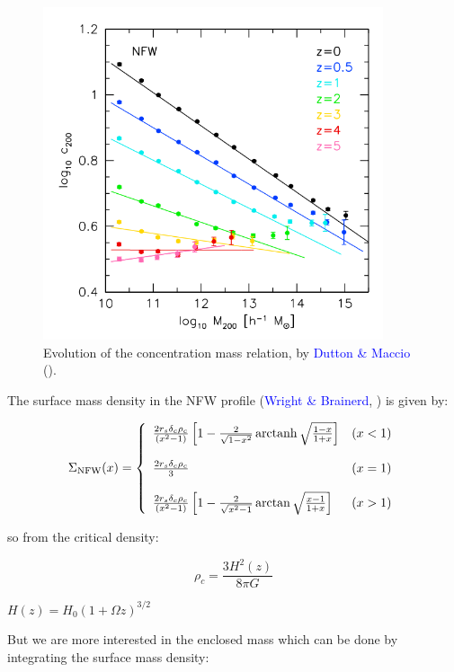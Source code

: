 \begin{appendices}
\begin{figure}[H]
\centering
\includegraphics[width=10cm]{images/dutton.png}
\caption[Evolution of the concentration mass relation]{Evolution of the concentration mass relation, by \textcolor{blue}{Dutton \& Maccio} (\citeyear{Reference23}).}
\end{figure}

The surface mass density in the NFW profile (\textcolor{blue}{Wright \& Brainerd}, \citeyear{Reference4}) is given by:

\begin{equation}
\Sigma_{\text{NFW}}(x) = \left\lbrace
\begin{array}{lll}
\frac{2r_{s}\delta_{c}\rho_{c}}{\left(x^{2}-1\right)}\left[1-\frac{2}{\sqrt{1-x^{2}}}\operatorname{arctanh}\sqrt{\frac{1-x}{1+x}}\right] & (x<1)\\\\
\frac{2r_{s}\delta_{c}\rho_{c}}{3} & (x=1)\\\\
\frac{2r_{s}\delta_{c}\rho_{c}}{\left(x^{2}-1\right)}\left[1-\frac{2}{\sqrt{x^{2}-1}}\arctan\sqrt{\frac{x-1}{1+x}}\right] & (x>1)
\end{array}
\right.
\end{equation} 

so from the critical density:

\begin{equation}
\rho_{c}=\frac{3H^2(z)}{8\pi G}
\end{equation}

$H(z)=H_{0}(1+\Omega z)^{3/2}$

But we are more interested in the enclosed mass which can be done by integrating the surface mass density:


\end{appendices}

